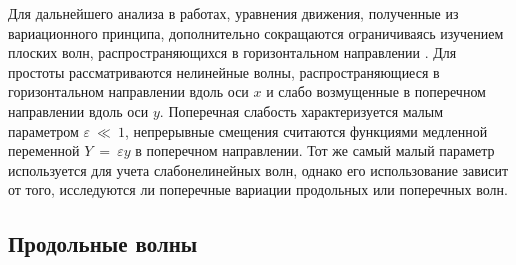 %
%
Для дальнейшего анализа в работах, уравнения движения, полученные из вариационного принципа, дополнительно сокращаются ограничиваясь изучением плоских волн, распространяющихся в горизонтальном направлении \cite{porkros}. Для простоты рассматриваются нелинейные волны, распространяющиеся в горизонтальном направлении вдоль оси $ x $ и слабо возмущенные в поперечном направлении вдоль оси $y$. Поперечная слабость характеризуется малым параметром $\varepsilon ~ \ll ~ 1$, непрерывные смещения считаются функциями медленной переменной $Y ~=~ \varepsilon y$ в поперечном направлении. Тот же самый малый параметр используется для учета слабонелинейных волн, однако его использование зависит от того, исследуются ли поперечные вариации продольных или поперечных волн. 

\subsection{Продольные волны}

